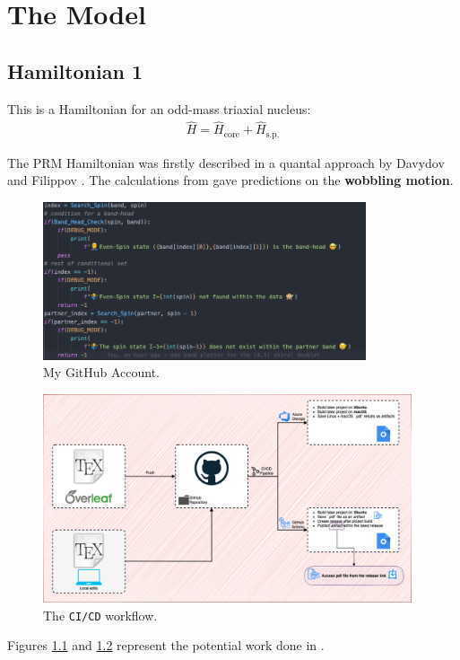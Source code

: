 \chapter{The Model}

\section{Hamiltonian 1}

This is a Hamiltonian for an odd-mass triaxial nucleus:
\begin{align}
    \hat{H}=\hat{H}_\text{core}+\hat{H}_\text{s.p.}
\end{align}

The PRM Hamiltonian was firstly described in a quantal approach by Davydov and Filippov \cite{davydov1958rotational}. The calculations from \cite{bohr1998nuclear} gave predictions on the \textbf{wobbling motion}.
\begin{figure}[ht]
    \centering
    \includegraphics[width=0.85\textwidth]{figs/cuterr_code.png}
    \caption{My GitHub Account.}
    \label{github_account}
\end{figure}
\begin{figure}[ht]
    \centering
    \includegraphics[width=0.97\textwidth]{figs/overleaf-book.png}
    \caption{The \texttt{CI/CD} workflow.}
    \label{workflow-scheme}
\end{figure}

Figures \ref{github_account} and \ref{workflow-scheme} represent the potential work done in \cite{poenaru2021parity}.

\lipsum[1-3]
    
